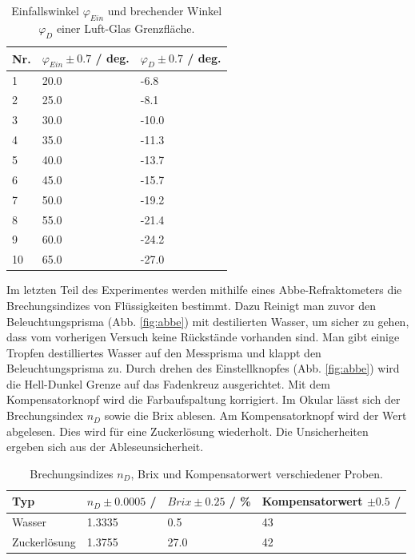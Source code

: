 \documentclass[12pt,a4paper,twoside]{article}
\begin{document}
\begin{table}[H]
    \centering
    \caption{Einfallswinkel $\varphi_{Ein}$ und brechender Winkel $\varphi_D$ einer Luft-Glas Grenzfläche. }
    \label{tab:brechender Winkel}
    \begin{tabular}{| l | l | l |}
        \hline
        Nr. &  $\varphi_{Ein} \pm 0.7$ / deg. & $\varphi_D \pm 0.7$ / deg.  \\
        \hline
        1   & 20.0  & -6.8  \\
        2   & 25.0  & -8.1  \\
        3   & 30.0  & -10.0 \\
        4   & 35.0  & -11.3 \\
        5   & 40.0  & -13.7 \\
        6   & 45.0  & -15.7 \\
        7   & 50.0  & -19.2 \\
        8   & 55.0  & -21.4 \\
        9   & 60.0  & -24.2 \\
        10  & 65.0  & -27.0 \\
        \hline
    \end{tabular}
\end{table}

\noindent
Im letzten Teil des Experimentes werden mithilfe eines Abbe-Refraktometers die Brechungsindizes von Flüssigkeiten bestimmt. 
Dazu Reinigt man zuvor den Beleuchtungsprisma (Abb. \ref{fig:abbe}) mit destilierten Wasser, um sicher zu gehen, dass vom vorherigen Versuch keine Rückstände vorhanden sind. 
Man gibt einige Tropfen destilliertes Wasser auf den Messprisma und klappt den Beleuchtungsprisma zu. Durch drehen des Einstellknopfes (Abb. \ref{fig:abbe}) wird die Hell-Dunkel Grenze auf das Fadenkreuz ausgerichtet. 
Mit dem Kompensatorknopf wird die Farbaufspaltung korrigiert. Im Okular lässt sich der Brechungsindex $n_D$ sowie die Brix ablesen. Am Kompensatorknopf wird der Wert abgelesen. 
Dies wird für eine Zuckerlösung wiederholt. Die Unsicherheiten ergeben sich aus der Ableseunsicherheit. 

\begin{table}[H]
    \centering
    \caption{Brechungsindizes $n_D$, Brix und Kompensatorwert verschiedener Proben. }
    \label{tab:abbe werte}
    \begin{tabular}{| l | l | l | l |}
        \hline
        Typ &  $n_D \pm 0.0005$ /  & $Brix \pm 0.25$ / \% & Kompensatorwert $\pm 0.5$ / \\
        \hline
        Wasser   & 1.3335  & 0.5 & 43  \\
        Zuckerlösung & 1.3755  & 27.0  & 42  \\
        \hline
    \end{tabular}
\end{table}
\end{document}

